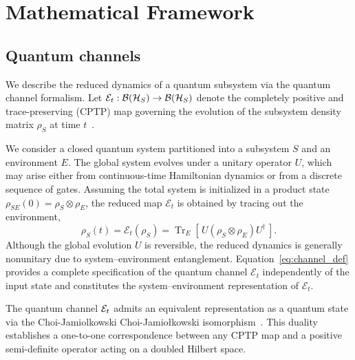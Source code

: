 \documentclass[pra,twocolumn,aps,showpacs,superscriptaddress,longbibliography]{revtex4-2}%
\newcommand{\jami}{Choi-Jamiołkowski}
\providecommand{\DIFadd}[1]{{\protect\color{blue} \sf #1}} %
\providecommand{\DIFdel}[1]{{\protect\color{red} \scriptsize #1}} %
\providecommand{\DIFaddbegin}{} %
\providecommand{\DIFaddend}{} %
\providecommand{\DIFdelbegin}{} %
\providecommand{\DIFdelend}{} %
\begin{document}
\DIFaddend \section{Mathematical Framework} \label{sec:formalism}

\subsection{Quantum channels}\label{sec:reduced_dynamics}

We describe the reduced dynamics of a quantum subsystem via the quantum channel formalism. Let $\mathcal{E}_t: \mathcal{B}(\mathcal{H}_S) \to \mathcal{B}(\mathcal{H}_S)$ denote the completely positive and trace-preserving (CPTP) map governing the evolution of the subsystem density matrix $\rho_S$ at time $t$~\cite{nielsen_2010_quantum,bengtsson_2006_geometry}.

We consider a closed quantum system partitioned into a subsystem $S$ and an environment $E$. The global system evolves under a unitary operator $U$, which may arise either from continuous-time Hamiltonian dynamics or from a discrete sequence of gates. Assuming the total system is initialized in a product state $\rho_{SE}(0)=\rho_S\otimes\rho_E$, the reduced map $\mathcal{E}_t$ is obtained by tracing out the environment,
\begin{equation}\label{eq:channel_def}
\rho_S(t)=\mathcal{E}_t(\rho_S)=\operatorname{Tr}_E\!\left[\,U(\rho_S\otimes\rho_E)U^\dagger\,\right].
\end{equation}
Although the global evolution $U$ is reversible, the reduced dynamics is generally nonunitary due to system–environment entanglement. Equation~\eqref{eq:channel_def} provides a complete specification of the quantum channel $\mathcal{E}_t$ independently of the input state and constitutes the system–environment representation of $\mathcal{E}_t$.

The quantum channel $\mathcal{E}_t$ admits an equivalent representation as a quantum state via the \DIFdelbegin \DIFdel{Choi-Jamiolkowski  }\DIFdelend \DIFaddbegin \DIFadd{\jami{}  }\DIFaddend isomorphism~\cite{jamiolkowski_1972_linear,choi_1975_completely}. This duality establishes a one-to-one correspondence between any CPTP map and a positive semi-definite operator acting on a doubled Hilbert space.
\end{document}
